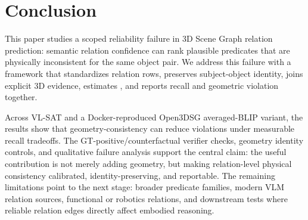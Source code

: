 \section{Conclusion}

This paper studies a scoped reliability failure in 3D Scene Graph relation
prediction: semantic relation confidence can rank plausible predicates that are
physically inconsistent for the same object pair. We address this failure with
a \method{} framework that standardizes relation rows, preserves
subject-object identity, joins explicit 3D evidence, estimates \pgeom{}, and
reports recall and geometric violation together.

Across VL-SAT and a Docker-reproduced Open3DSG averaged-BLIP variant, the
results show that geometry-consistency can reduce violations under measurable
recall tradeoffs. The GT-positive/counterfactual verifier checks, geometry
identity controls, and qualitative failure analysis support the central claim:
the useful contribution is not merely adding geometry, but making relation-level
physical consistency calibrated, identity-preserving, and reportable. The
remaining limitations point to the next stage: broader predicate families,
modern VLM relation sources, functional or robotics relations, and downstream
tests where reliable relation edges directly affect embodied reasoning.

